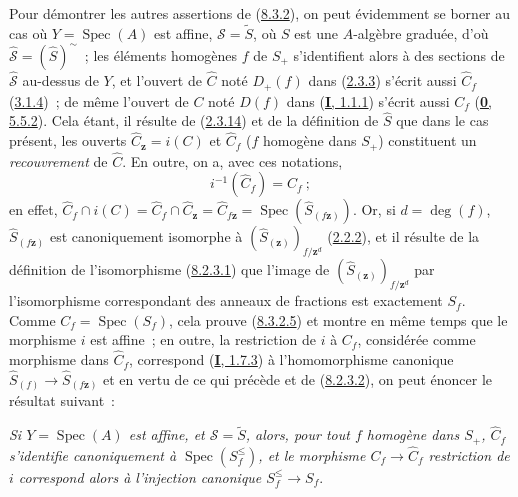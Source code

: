 Pour démontrer les autres assertions de
(\hyperref[II.8.3.2-fr]{8.3.2}), on peut évidemment se borner au cas où
$Y=\operatorname{Spec}(A)$ est affine, $\mathcal{S}=\widetilde{S}$, où $S$
est une $A$-algèbre graduée, d'où
$\widehat{\mathcal{S}}=(\widehat{S})^{\sim}$~; les éléments homogènes $f$ de
$S_+$ s'identifient alors à des sections de $\widehat{\mathcal{S}}$ au-dessus
de $Y$, et l'ouvert de $\widehat{C}$ noté $D_+(f)$ dans
(\hyperref[II.2.3.3-fr]{2.3.3}) s'écrit aussi $\widehat{C}_f$
(\hyperref[II.3.1.4-fr]{3.1.4})~; de même l'ouvert de $C$ noté $D(f)$ dans
(\hyperref[I.1.1.1-fr]{\textbf{I}, 1.1.1}) s'écrit aussi $C_f$
(\hyperref[0.5.5.2-fr]{\textbf{0}, 5.5.2}). Cela étant, il résulte de
(\hyperref[II.2.3.14-fr]{2.3.14}) et de la définition de $\widehat{S}$ que
dans le cas présent, les ouverts $\widehat{C}_{\mathbf{z}}=i(C)$ et $\widehat{C}_f$
($f$ homogène dans $S_+$) constituent un \emph{recouvrement} de
$\widehat{C}$. En outre, on a, avec ces notations,
\begin{equation}
\label{II.8.3.2.5-fr}
  i^{-1}(\widehat{C}_f)=C_f~;
\tag{8.3.2.5}
\end{equation}
en effet,
$\widehat{C}_f\cap i(C)=\widehat{C}_f\cap\widehat{C}_{\mathbf{z}}
=\widehat{C}_{f\mathbf{z}}=\operatorname{Spec}(\widehat{S}_{(f\mathbf{z})})$. Or, si
$d=\deg(f)$, $\widehat{S}_{(f\mathbf{z})}$ est canoniquement isomorphe à
$(\widehat{S}_{(\mathbf{z})})_{f/\mathbf{z}^d}$ (\hyperref[II.2.2.2-fr]{2.2.2}), et il résulte
de la définition de l'isomorphisme
(\hyperref[II.8.2.3.1-fr]{8.2.3.1}) que l'image de
$(\widehat{S}_{(\mathbf{z})})_{f/\mathbf{z}^d}$ par l'isomorphisme correspondant des anneaux de
fractions est exactement $S_f$. Comme $C_f=\operatorname{Spec}(S_f)$, cela
prouve (\hyperref[II.8.3.2.5-fr]{8.3.2.5}) et montre en même temps que le
morphisme $i$ est affine~; en outre, la restriction de $i$ à $C_f$,
considérée comme morphisme dans $\widehat{C}_f$, correspond
(\hyperref[I.1.7.3-fr]{\textbf{I}, 1.7.3}) à l'homomorphisme canonique
$\widehat{S}_{(f)}\to\widehat{S}_{(f\mathbf{z})}$ et en vertu de ce qui précède et de
(\hyperref[II.8.2.3.2-fr]{8.2.3.2}), on peut énoncer le résultat suivant~:

\begin{env}[8.3.2.6]
\label{II.8.3.2.6-fr}
\emph{Si $Y=\operatorname{Spec}(A)$ est affine, et $\mathcal{S}=\widetilde{S}$,
alors, pour tout $f$ homogène dans $S_+$, $\widehat{C}_f$ s'identifie
canoniquement à $\operatorname{Spec}(S_f^{\leq})$, et le morphisme
$C_f\to\widehat{C}_f$ restriction de $i$ correspond alors à l'injection
canonique $S_f^{\leq}\to S_f$}.
\end{env}

